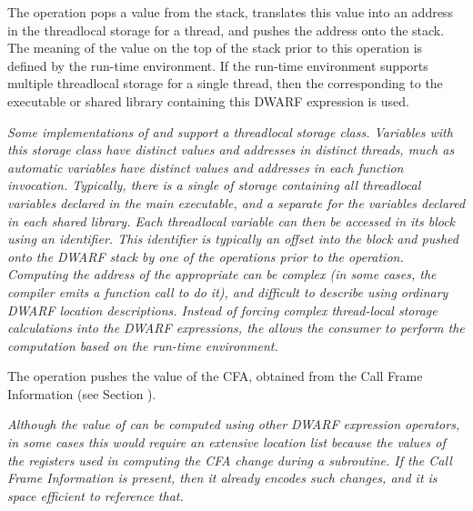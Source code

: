 \begin{enumerate}[1. ]
\itembfnl{\DWOPformtlsaddressTARG}
The \DWOPformtlsaddressTARG{} 
operation pops a value from the stack, translates this
value into an address in the 
thread\dash local storage for a thread, and pushes the address 
onto the stack. 
The meaning of the value on the top of the stack prior to this 
operation is defined by the run-time environment.  If the run-time 
environment supports multiple thread\dash local storage 
 for a single thread, then the  
corresponding to the executable or shared 
library containing this DWARF expression is used.
   
\textit{Some implementations of 
 and  support a
thread\dash local storage class. Variables with this storage class
have distinct values and addresses in distinct threads, much
as automatic variables have distinct values and addresses in
each function invocation. Typically, there is a single 
of storage containing all thread\dash local variables declared in
the main executable, and a separate  for the variables
declared in each shared library. 
Each thread\dash local variable can then be accessed in its block using an
identifier. This identifier is typically an offset into the block and pushed
onto the DWARF stack by one of the 
\DWOPconstnx{} operations prior to the
\DWOPformtlsaddress{} operation. 
Computing the address of
the appropriate  can be complex (in some cases, the
compiler emits a function call to do it), and difficult
to describe using ordinary DWARF location descriptions.
Instead of    forcing complex thread-local storage calculations into 
the DWARF expressions, the \DWOPformtlsaddress{} allows the consumer 
to perform the computation based on the run-time environment.}

\itembfnl{\DWOPcallframecfaTARG}
The \DWOPcallframecfaTARG{} 
operation pushes the value of the
CFA, obtained from the Call Frame Information 
(see Section ).

\textit{Although the value of \DWATframebase{}
can be computed using other DWARF expression operators,
in some cases this would require an extensive location list
because the values of the registers used in computing the
CFA change during a subroutine. If the 
Call Frame Information 
is present, then it already encodes such changes, and it is
space efficient to reference that.}
\end{enumerate}

